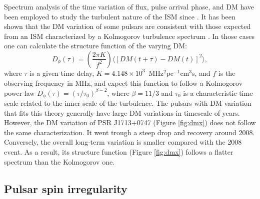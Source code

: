 
Spectrum analysis of the time variation of flux, pulse arrival phase, and DM have 
been employed to study the turbulent nature of the ISM since \citealt{cpl86, rl90}.
It has been shown that the DM variation of some pulsars are consistent with
those expected from an ISM characterized by a Kolmogorov turbulence spectrum
\citep{cwd+90, ric90, ktr94, yhc+07, kcs+13, fst14}. In those cases one can calculate the 
structure function of the varying DM: 
\begin{equation}
D_{\phi}(\tau)=\left(\frac{2\pi K}{f^2}\right)\langle [DM(t+\tau)-DM(t)]^2\rangle, 
\end{equation}
where $\tau$ 
is a given time delay, $K=4.148\times10^3$~MHz$^2$pc$^{-1}$cm$^3$s, and $f$ is 
the observing frequency in MHz, and expect 
this function to follow a Kolmogorov power law $D_{\phi}(\tau)=(\tau/\tau_0)^{\beta -2}$, 
where $\beta=11/3$ and $\tau_0$ is a characteristic time scale related to 
the inner scale of the turbulence. The pulsars with DM variation that fits this
theory generally have large DM variations in timescale of 
years. However, the DM variation of PSR J1713+0747 (Figure \ref{fig:dmx}) does not 
follow the same characterization. It went trough a steep drop and recovery 
around 2008. Conversely, the overall long-term variation is smaller
compared with the 2008 event. As a result, its structure function (Figure \ref{fig:dmx}) 
follows a flatter spectrum than the Kolmogorov one.


\subsection{Pulsar spin irregularity}
\label{sec:noise}

